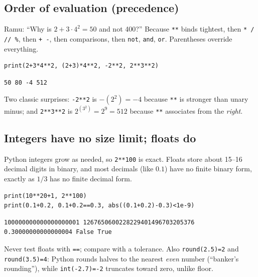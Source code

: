 \documentclass[11pt,a4paper]{article}
\newcommand{\py}[1]{\texttt{#1}}
\begin{document}
\subsection{Order of evaluation (precedence)}
Ramu: ``Why is $2+3\cdot 4^2=50$ and not 400?'' Because \py{**} binds tightest, then \py{* / // \%}, then \py{+ -}, then comparisons, then \py{not}, \py{and}, \py{or}. Parentheses override everything.
\begin{lstlisting}
print(2+3*4**2, (2+3)*4**2, -2**2, 2**3**2)
\end{lstlisting}
\begin{lstlisting}[style=out]
50 80 -4 512
\end{lstlisting}
Two classic surprises: \py{-2**2} is $-(2^2)=-4$ because \py{**} is stronger than unary minus; and \py{2**3**2} is $2^{(3^2)}=2^9=512$ because \py{**} associates from the \emph{right}.

\subsection{Integers have no size limit; floats do}
Python integers grow as needed, so \py{2**100} is exact. Floats store about 15--16 decimal digits in binary, and most decimals (like $0.1$) have no finite binary form, exactly as $1/3$ has no finite decimal form.
\begin{lstlisting}
print(10**20+1, 2**100)
print(0.1+0.2, 0.1+0.2==0.3, abs((0.1+0.2)-0.3)<1e-9)
\end{lstlisting}
\begin{lstlisting}[style=out]
100000000000000000001 1267650600228229401496703205376
0.30000000000000004 False True
\end{lstlisting}
\begin{trap}
Never test floats with \py{==}; compare with a tolerance. Also \py{round(2.5)=2} and \py{round(3.5)=4}: Python rounds halves to the nearest \emph{even} number (``banker's rounding''), while \py{int(-2.7)=-2} truncates toward zero, unlike floor.
\end{trap}
\end{document}
